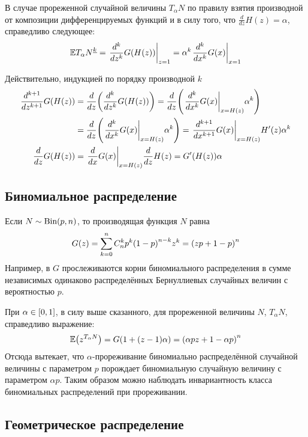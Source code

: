\documentclass[a4paper]{article}
\let\originalleft\left
\let\originalright\right
\renewcommand{\left}{\mathopen{}\mathclose\bgroup\originalleft}
\renewcommand{\right}{\aftergroup\egroup\originalright}
\newcommand{\clo}[1]{{\left [ #1 \right ]}}
\newcommand{\brac}[1]{{\left ( #1 \right )}}
\newcommand{\induc}[1]{{\left . #1 \right \vert}}
\newcommand{\Ex}[0]{{\mathbb{E}}}
\begin{document}
В случае прореженной случайной величины $T_\alpha N$ по правилу взятия
производной от композиции дифференцируемых функций и в силу того, что
$\frac{d}{dz}H(z) = \alpha$, справедливо следующее: 
\[\Ex {T_\alpha N}^{\underline{k}} = \induc{\frac{d^k}{dz^k} G\brac{H(z)} }_{z=1}
= \alpha^k\induc{\frac{d^k}{dx^k} G(x) }_{x=1}\]

Действительно, индукцией по порядку производной $k$ \begin{align*}
	\frac{d^{k+1}}{dz^{k+1}} G\brac{H(z)} & = \frac{d}{dz}\brac{ \frac{d^k}{dz^k} G\brac{H(z)} } = \frac{d}{dz}\brac{ \induc{\frac{d^k}{dx^k} G(x) }_{x=H(z)} \alpha^k }\\
	& = \frac{d}{dz}\brac{ \induc{\frac{d^k}{dx^k} G(x) }_{x=H(z)} \alpha^k } = \induc{\frac{d^{k+1}}{dx^{k+1}} G(x) }_{x=H(z)} H'(z) \alpha^k\\
	\frac{d}{dz} G\brac{H(z)} & = \induc{\frac{d}{dx} G(x) }_{x=H(z)} \frac{d}{dz} H(z) = G'\brac{H(z)} \alpha
\end{align*}


\subsection{Биномиальное распределение} %
\label{sub:binomial}

Если $N\sim\text{Bin}\brac{p,n}$, то производящая функция $N$ равна
\[G(z) = \sum_{k=0}^n C_n^k p^k \brac{1-p}^{n-k} z^k = \brac{ zp + 1-p }^n\]
Например, в $G$ прослеживаются корни биномиального распределения в сумме
независимых одинаково распределённых Бернуллиевых случайных величин
с вероятностью $p$.

При $\alpha\in \clo{0,1}$, в силу выше сказанного, для прореженной
величины $N$, $T_\alpha N$, справедливо выражение:
\[\Ex\brac{z^{T_\alpha N}} = G\brac{1 + (z-1) \alpha} = \brac{ \alpha p z + 1 - \alpha p }^n\]
Отсюда вытекает, что $\alpha$-прореживание биномиально распределённой
случайной величины с параметром $p$ порождает биномиальную случайную величину
с параметром $\alpha p$.
Таким образом можно наблюдать инвариантность класса биномиальных распределений при прореживании.


\subsection{Геометрическое распределение} %
\label{sub:geometric}
\end{document}
